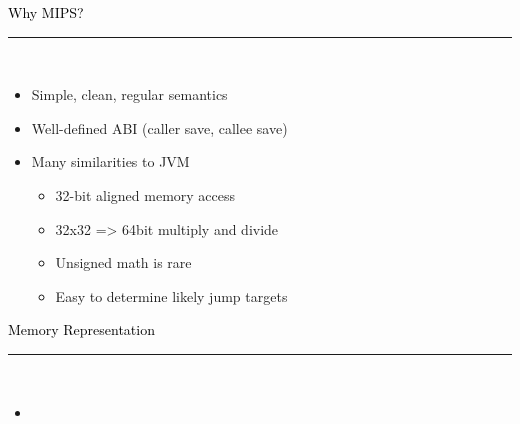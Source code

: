 \documentclass[letter]{seminar}
\begin{document}
\begin{slide}\raggedright
\renewcommand{\leftmargini}{5mm}
{\Large{\textcolor{black}{Why MIPS?}}}
\\\rule{\textwidth}{0.1pt}\\

\begin{itemize}


\item
         Simple, clean, regular semantics

\item
         Well-defined ABI (caller save, callee save)

\item
         Many similarities to JVM
\begin{itemize}


\item
             32-bit aligned memory access

\item
             32x32 => 64bit multiply and divide

\item
             Unsigned math is rare

\item
             Easy to determine likely jump targets


\end{itemize}

\end{itemize}


\end{slide}


\begin{slide}\raggedright
\renewcommand{\leftmargini}{5mm}
{\Large{\textcolor{black}{Memory Representation}}}
\\\rule{\textwidth}{0.1pt}\\

\begin{itemize}

\item \begin{figure}[H]
\begin{center}
\end{center}
\end{figure}

\end{itemize}


\end{slide}
\end{document}
